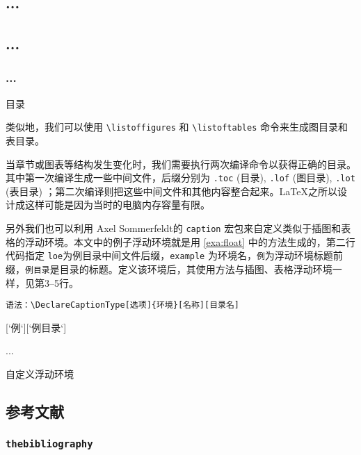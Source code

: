 \begin{example}[!h]
\begin{Code}[]
\tableofcontents
\setcounter{tocdepth}{2}
\chapter*{...}
\section*{...}
\subsection*{...}
\end{Code}
\caption{目录}
\label{exa:toc}
\end{example}

类似地，我们可以使用 \verb|\listoffigures| 和 \verb|\listoftables| 命令来生成图目录和表目录。

当章节或图表等结构发生变化时，我们需要执行两次编译命令以获得正确的目录。其中第一次编译生成一些中间文件，后缀分别为 \texttt{.toc} (目录), \texttt{.lof} (图目录), \texttt{.lot} (表目录) ；第二次编译则把这些中间文件和其他内容整合起来。\LaTeX 之所以设计成这样可能是因为当时的电脑内存容量有限。

另外我们也可以利用 Axel Sommerfeldt\indexSommerfeldt 的 \texttt{caption} 宏包\citep{Sommerfeldt_caption}来自定义类似于插图和表格的浮动环境。本文中的例子浮动环境就是用 \autoref{exa:float} 中的方法生成的，第二行代码指定 \texttt{loe}为例目录中间文件后缀，\texttt{example} 为环境名，\texttt{例}为浮动环境标题前缀，\texttt{例目录}是目录的标题。定义该环境后，其使用方法与插图、表格浮动环境一样，见第3--5行。

\noindent
\verb|语法：\DeclareCaptionType[选项]{环境}[名称][目录名]|
\begin{example}[htbp]
\begin{Code}[numbers=none]
\usepackage{caption}
[`例`][`例目录`]
\begin{example}[htbp]
...
\end{example}
\end{Code}
\caption{自定义浮动环境}
\label{exa:float}
\end{example}

\section{参考文献}

\subsection{\texttt{thebibliography}}
\label{sec:thebibliography}


